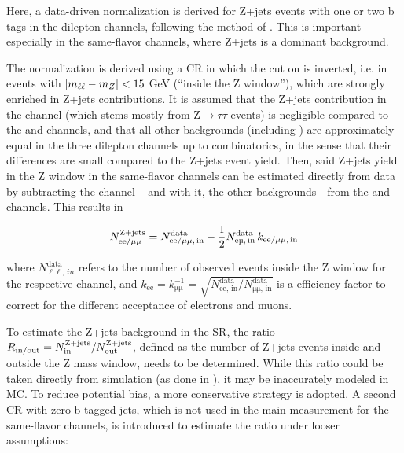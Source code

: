 Here, a data-driven normalization is derived for Z+jets events with one or two b tags in the dilepton channels, following the method of . This is important especially in the same-flavor channels, where Z+jets is a dominant background.

The normalization is derived using a CR in which the cut on \mll is inverted, i.e. in events with $| m_{\ell\ell} - m_Z | < 15$ GeV (``inside the Z window''), which are strongly enriched in Z+jets contributions. It is assumed that the Z+jets contribution in the \emu channel (which stems mostly from $\mathrm{Z} \rightarrow \tau \tau$ events) is negligible compared to the \ee and \mumu channels, and that all other backgrounds (including \ttbar) are approximately equal in the three dilepton channels up to combinatorics, in the sense that their differences are small compared to the Z+jets event yield. Then, said Z+jets yield in the Z window in the same-flavor channels can be estimated directly from data by subtracting the \emu channel -- and with it, the other backgrounds - from the \ee and \mumu channels. This results in

\begin{equation}
\label{eq:ttxs:zjets_yield}
    N_{\mathrm{ee / \mu\mu}}^{\mathrm{Z+jets}} = N_{\mathrm{ee / \mu\mu,\,in}}^{\mathrm{data}} - \frac{1}{2} N_{\mathrm{\emu,\,in}}^{\mathrm{data}} \, k_{\mathrm{ee / \mu\mu,\,in}}
\end{equation}

\noindent where $N_{\mathrm{\ell \ell},\,in}^{\mathrm{data}}$ refers to the number of observed events inside the Z window for the respective channel, and $k_{\mathrm{ee}} = k_{\mathrm{\mu\mu}}^{-1} = \sqrt{N_{\mathrm{ee,\,in}}^{\mathrm{data}} / N_{\mathrm{\mu\mu,\,in}}^{\mathrm{data}}}$ is a efficiency factor to correct for the different acceptance of electrons and muons.

To estimate the Z+jets background in the SR, the ratio $R_{\mathrm{in/out}} = N_{\mathrm{in}}^{\mathrm{Z+jets}} / N_{\mathrm{out}}^{\mathrm{Z+jets}}$, defined as the number of Z+jets events inside and outside the Z mass window, needs to be determined. While this ratio could be taken directly from simulation (as done in ), it may be inaccurately modeled in MC. To reduce potential bias, a more conservative strategy is adopted. A second CR with zero b-tagged jets, which is not used in the main measurement for the same-flavor channels, is introduced to estimate the ratio under looser assumptions:

